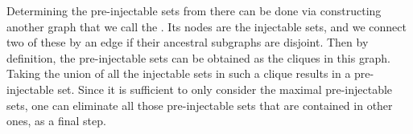 Determining the pre-injectable sets from there can be done via constructing another graph that we call the . Its nodes are the injectable sets, and we connect two of these by an edge if their ancestral subgraphs are disjoint. Then by definition, the pre-injectable sets can be obtained as the cliques in this graph. Taking the union of all the injectable sets in such a clique results in a pre-injectable set. Since it is sufficient to only consider the maximal pre-injectable sets, one can eliminate all those pre-injectable sets that are contained in other ones, as a final step.



